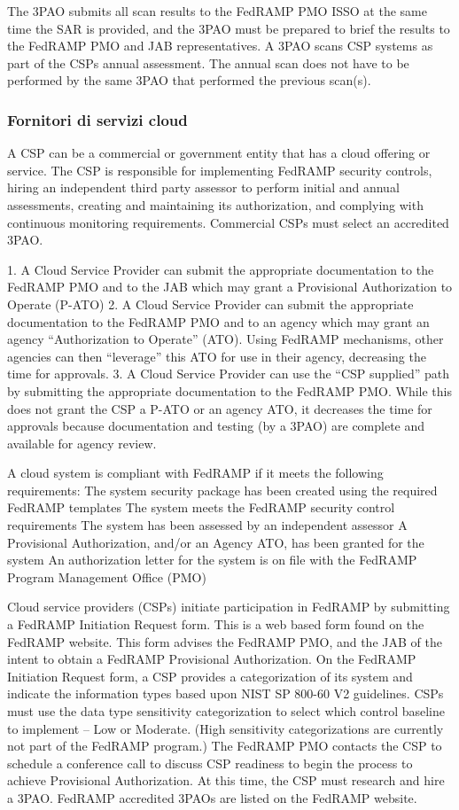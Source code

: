 \documentclass[../main.tex]{subfiles}
\begin{document}
The 3PAO submits all scan results to the FedRAMP PMO ISSO at the same time the SAR is provided, and the 3PAO must be prepared to brief the results to the FedRAMP PMO and JAB representatives.  
A 3PAO scans CSP systems as part of the CSPs annual assessment.  The annual scan does not have to be performed by the same 3PAO that performed the previous scan(s).  


\subsubsection{Fornitori di servizi cloud}
A CSP can be a commercial or government entity that has a cloud offering or service.  The CSP is responsible for implementing FedRAMP security controls, hiring an independent third party assessor to perform initial and annual assessments, creating and maintaining its authorization, and complying with continuous monitoring requirements. Commercial CSPs must select an accredited 3PAO.    

1. A Cloud Service Provider can submit the appropriate documentation to the FedRAMP PMO and to the JAB which may grant a Provisional Authorization to Operate (P-ATO)
2. A Cloud Service Provider can submit the appropriate documentation to the FedRAMP PMO and to an agency which may grant an agency “Authorization to Operate” (ATO).  Using FedRAMP mechanisms, other agencies can then “leverage” this ATO for use in their agency, decreasing the time for approvals.
3. A Cloud Service Provider can use the “CSP supplied” path by submitting the appropriate documentation to the FedRAMP PMO.  While this does not grant the CSP a P-ATO or an agency ATO, it decreases the time for approvals because documentation and testing (by a 3PAO) are complete and available for agency review.




A cloud system is compliant with FedRAMP if it meets the following requirements:
The system security package has been created using the required FedRAMP templates
The system meets the FedRAMP security control requirements
The system has been assessed by an independent assessor
A Provisional Authorization, and/or an Agency ATO, has been granted for the system
An authorization letter for the system is on file with the FedRAMP Program Management Office (PMO)



Cloud service providers (CSPs) initiate participation in FedRAMP by submitting a FedRAMP Initiation Request form.  This is a web based form found on the FedRAMP website.  This form advises the FedRAMP PMO, and the JAB of the intent to obtain a FedRAMP Provisional Authorization.  
On the FedRAMP Initiation Request form, a CSP provides a categorization of its system and indicate the information types based upon NIST SP 800-60 V2 guidelines.  CSPs must use the data type sensitivity categorization to select which control baseline to implement – Low or Moderate.  (High sensitivity categorizations are currently not part of the FedRAMP program.)  The FedRAMP PMO contacts the CSP to schedule a conference call to discuss CSP readiness to begin the process to achieve Provisional Authorization.
At this time, the CSP must research and hire a 3PAO.  FedRAMP accredited 3PAOs are listed on the FedRAMP website.  
\end{document}
